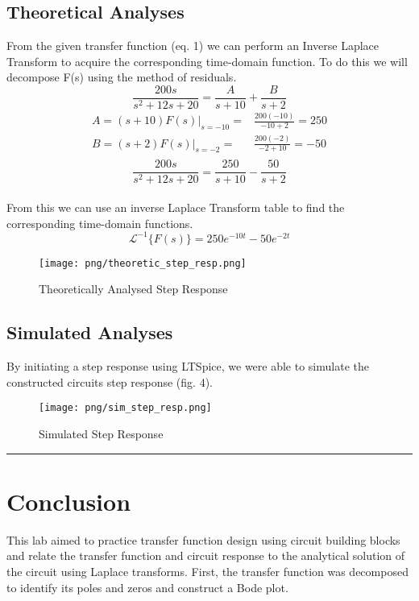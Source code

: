 \documentclass{article}
\begin{document}
\subsection*{\textcolor{mycolor}{Theoretical Analyses}}
From the given transfer function (eq. 1) we can perform an Inverse Laplace Transform to acquire the corresponding time-domain function. To do this we will decompose F(s) using the method of residuals.
\begin{equation*}
    \frac{200s}{s^2+12s+20} = \frac{A}{s+10} + \frac{B}{s+2}
\end{equation*}
\begin{align*}
    A=(s+10)F(s)|_{s=-10}=& \frac{200(-10)}{-10+2} = 250\\
    B=(s+2)F(s)|_{s=-2}=& \frac{200(-2)}{-2+10} = -50\\
\end{align*}
\begin{equation*}
    \frac{200s}{s^2+12s+20} = \frac{250}{s+10} - \frac{50}{s+2}
\end{equation*}
\\
From this we can use an inverse Laplace Transform table to find the corresponding time-domain functions.
\begin{equation*}
    \mathcal{L}^{-1}\{F(s)\}=250e^{-10t}-50e^{-2t}
\end{equation*}

\begin{figure}[H]
    \centering
    \texttt{[image: png/theoretic\_step\_resp.png]}
    \caption{Theoretically Analysed Step Response}
    \label{fig:Theoretically Analysed Step Response}
\end{figure}

\subsection*{\textcolor{mycolor}{Simulated Analyses}}
By initiating a step response using LTSpice, we were able to simulate the constructed circuits step response (fig. 4). 
\begin{figure}[H]
    \centering
    \texttt{[image: png/sim\_step\_resp.png]}
    \caption{Simulated Step Response}
    \label{fig:Simulated Step Response}
\end{figure}
\vspace{5mm}
\hrule

\section*{\textcolor{mycolor}{Conclusion}}
This lab aimed to practice transfer function design using circuit building blocks and relate the transfer function and circuit response to the analytical solution of the circuit using Laplace transforms. First, the transfer function was decomposed to identify its poles and zeros and construct a Bode plot. 
\end{document}
